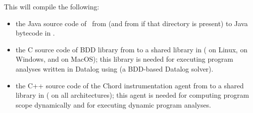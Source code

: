 \noindent This will compile the following:
\begin{itemize}
\item
the Java source code of \Chord\ from  (and from  if that directory is present) to Java bytecode in .
\item
the C source code of BDD library  from  to a shared library in  ( on Linux,  on Windows, and  on MacOS); this library is needed for executing program analyses written in Datalog using  (a BDD-based Datalog solver).
\item
the C++ source code of the Chord instrumentation agent from  to a shared library in  ( on all architectures); this agent is needed for computing program scope dynamically and for executing dynamic program analyses.
\end{itemize}

